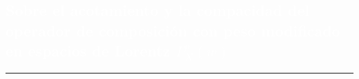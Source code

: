 \begin{titlepage}
  \newcommand{\Disk}{\mathbb{D}}
 \newcommand{\BOP}{\mathbf{B}}
 \newcommand{\BBd}{\mathcal{B}\left(\Bergman\left(\Disk\right)\right)}
  \newcommand{\BBp}{\mathcal{B}\left(\Bergman\left(\Pi\right)\right)}
 \newcommand{\BH}{\mathcal{B}(\mathfrak{H})}
 \newcommand{\KH}{\mathcal{K}(\mathfrak{H})}
 \renewcommand{\ker}{\operatorname{ker}}
\newcommand{\Rang}{\operatorname{Rang}}
 \newcommand{\Real}{\mathbb{R}}
 \newcommand{\Entero}{\mathbb{Z}}
 \newcommand{\Complex}{\mathbb{C}}
 \newcommand{\Field}{\mathbb{F}}
\newcommand{\F}{\operatorname{F}}
 \newcommand{\RPlus}{\Real^{+}}
 \newcommand{\Polar}{\mathcal{P}_{\s}}
 \newcommand{\Poly}{\mathcal{P}(E)}
 \newcommand{\EssD}{\mathcal{D}}
 \newcommand{\Lpi}{L_{\infty}(0,\pi)}
 \newcommand{\Ele}{L_{2}}
 \newcommand{\Bergman}{\mathcal{A}^{2}}
 \newcommand{\States}{\mathcal{T}}
 \newcommand{\abs}[1]{\left\vert#1\right\vert}
 \newcommand{\set}[1]{\left\{#1\right\}}
 \newcommand{\seq}[1]{\left<#1\right>}
 \newcommand{\norm}[1]{\left\Vert#1\right\Vert}
 \newcommand{\essnorm}[1]{\norm{#1}_{\ess}}

\pagecolor{white}
\BgThispage
{}
\vspace*{-1.1cm}
\noindent
\def\titulo#1{\section{#1}}
\section{\bf\large\textcolor{white}{Sobre el acotamiento y la compacidad del operador de composici\'{o}n con peso modificado en espacios de Lorentz  $\Gamma_{X}^{p}(w)$}}
\vspace*{2cm}\par
\noindent

\begin{minipage}{0.5\linewidth}
\begin{minipage}{0.45\linewidth}
    \begin{flushright}
        \printauthor
    \end{flushright}
\end{minipage} \hspace{0pt}
%
\begin{minipage}{0.02\linewidth}
      \color{ptctitle} \rule{1pt}{175pt}
\end{minipage} 
\end{minipage}
\hspace*{-4.5cm}
%
\begin{minipage}{0.85\linewidth}
\begin{minipage}{0.85\linewidth}
\footnotesize
\vspace{5pt}
    \begin{resumen}    


\end{resumen}
\end{minipage}
\end{minipage}
\end{titlepage}
